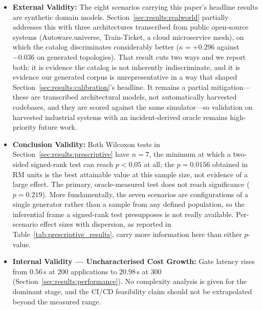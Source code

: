 \begin{itemize}
    \item \textbf{External Validity:} The eight scenarios carrying this paper's headline results are synthetic domain models. Section~\ref{sec:results:realworld} partially addresses this with three architectures transcribed from public open-source systems (Autoware.universe, Train-Ticket, a cloud microservice mesh), on which the catalog discriminates considerably better ($\kappa = +0.296$ against $-0.036$ on generated topologies). That result cuts two ways and we report both: it is evidence the catalog is not inherently indiscriminate, and it is evidence our generated corpus is unrepresentative in a way that shaped Section~\ref{sec:results:calibration}'s headline. It remains a partial mitigation---these are transcribed architectural models, not automatically harvested codebases, and they are scored against the same simulator---so validation on harvested industrial systems with an incident-derived oracle remains high-priority future work.
    \item \textbf{Conclusion Validity:} Both Wilcoxon tests in Section~\ref{sec:results:prescriptive} have $n=7$, the minimum at which a two-sided signed-rank test can reach $p<0.05$ at all; the $p=0.0156$ obtained in RM units is the best attainable value at this sample size, not evidence of a large effect. The primary, oracle-measured test does not reach significance ($p=0.219$). More fundamentally, the seven scenarios are configurations of a single generator rather than a sample from any defined population, so the inferential frame a signed-rank test presupposes is not really available. Per-scenario effect sizes with dispersion, as reported in Table~\ref{tab:prescriptive_results}, carry more information here than either $p$-value.
    \item \textbf{Internal Validity --- Uncharacterised Cost Growth:} Gate latency rises from $0.56$\,s at 200 applications to $20.98$\,s at 300 (Section~\ref{sec:results:performance}). No complexity analysis is given for the dominant stage, and the CI/CD feasibility claim should not be extrapolated beyond the measured range.
\end{itemize}
